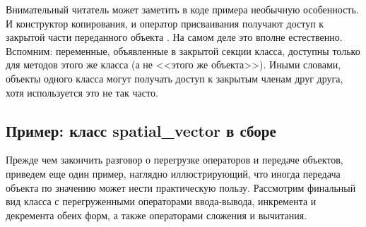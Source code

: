 Внимательный читатель может заметить в коде примера необычную особенность. И конструктор копирования,
и оператор присваивания получают доступ к закрытой части переданного объекта
. На самом деле это вполне естественно. Вспомним:  переменные, объявленные
в закрытой секции класса, доступны только для методов этого же класса (а не <<этого же объекта>>). Иными словами, объекты
одного класса могут получать доступ к закрытым членам друг друга, хотя используется это не так часто.

\subsection[Пример: класс spatial\_vector в сборе]{Пример: класс spatial\_vector в сборе}
\label{ch10:2.3}
Прежде чем закончить разговор о перегрузке операторов и передаче
объектов, приведем еще один пример, наглядно иллюстрирующий, что иногда передача объекта по значению может нести
практическую пользу. Рассмотрим финальный вид класса
 с перегруженными операторами
ввода-вывода, инкремента и декремента обеих форм, а также операторами сложения и вычитания. 
